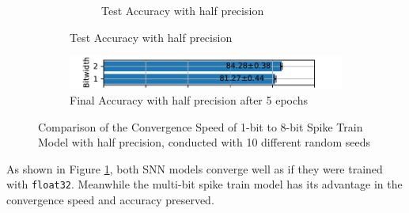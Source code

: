 \begin{figure}[!htpb]
\begin{subfigure}[H]{\textwidth}
\begin{subfigure}[H]{\textwidth}
                \caption{Test Accuracy with half precision}
            \end{subfigure}
        \end{subfigure}
        \hfill
        \begin{subfigure}[H]{\textwidth}
            \centering
            \includegraphics[width=\textwidth]{../bf16/FashionMNIST/plots/fashionmnist_final_acc_horizontal.pdf}
            \caption{Final Accuracy with half precision after 5 epochs}
        \end{subfigure}
        \caption{Comparison of the Convergence Speed of 1-bit to 8-bit Spike Train Model with half precision, conducted with 10 different random seeds}
        \label{fig:half_precision}
    \end{figure}

    As shown in Figure \ref{fig:half_precision}, both SNN models converge well as if they were trained with \verb|float32|. Meanwhile the multi-bit spike train model has its advantage in the convergence speed and accuracy preserved. 
    
